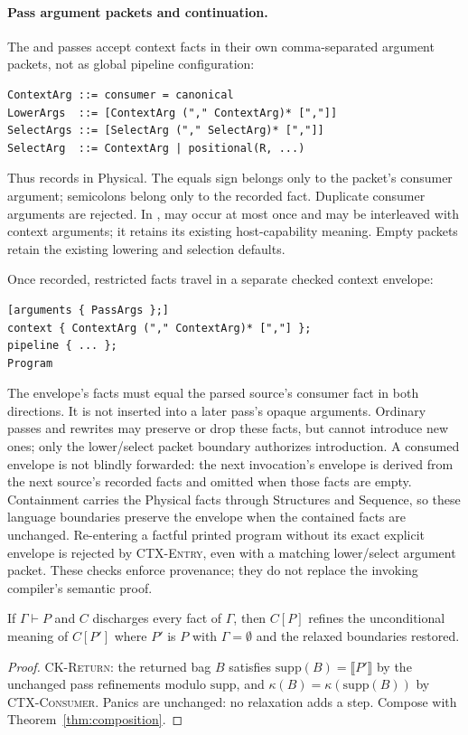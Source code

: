 \paragraph{Pass argument packets and continuation.}
The  and  passes accept context facts in their own
comma-separated argument packets, not as global pipeline configuration:
\begin{lstlisting}
ContextArg ::= consumer = canonical
LowerArgs  ::= [ContextArg ("," ContextArg)* [","]]
SelectArgs ::= [SelectArg ("," SelectArg)* [","]]
SelectArg  ::= ContextArg | positional(R, ...)
\end{lstlisting}
Thus  records
 in Physical.
The equals sign belongs only to the packet's consumer argument; semicolons
belong only to the recorded fact. Duplicate consumer arguments are rejected.
In ,  may occur at most once and may be
interleaved with context arguments; it retains its existing host-capability
meaning. Empty packets retain the existing lowering and selection defaults.

Once recorded, restricted facts travel in a separate checked context envelope:
\begin{lstlisting}
[arguments { PassArgs };]
context { ContextArg ("," ContextArg)* [","] };
pipeline { ... };
Program
\end{lstlisting}
The envelope's facts must equal the parsed source's consumer fact
in both directions. It is not inserted into a later
pass's opaque arguments. Ordinary passes and rewrites may preserve or drop
these facts, but cannot introduce new ones; only the lower/select packet
boundary authorizes introduction.
A consumed envelope is not blindly forwarded: the next invocation's
envelope is derived from the next source's recorded facts and omitted when
those facts are empty. Containment carries the Physical facts through
Structures and Sequence, so these language boundaries preserve the envelope
when the contained facts are unchanged. Re-entering a factful printed program
without its exact explicit envelope is rejected by \textsc{CTX-Entry},
even with a matching lower/select argument packet. These checks enforce
provenance; they do not replace the invoking compiler's semantic proof.

\begin{theorem}
If $\Gamma\vdash P$ and $C$ discharges every fact of $\Gamma$, then $C[P]$ refines the
unconditional meaning of $C[P']$ where $P'$ is $P$ with $\Gamma=\emptyset$
and the relaxed boundaries restored.
\end{theorem}
\begin{proof}
\textsc{CK-Return}: the returned bag $B$ satisfies
$\mathrm{supp}(B)=\llbracket P'\rrbracket$ by the unchanged pass
refinements modulo $\mathrm{supp}$, and $\kappa(B)=\kappa(\mathrm{supp}(B))$
by \textsc{CTX-Consumer}. Panics are unchanged: no relaxation adds a step.
Compose with Theorem~\ref{thm:composition}.
\end{proof}

